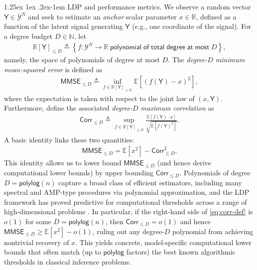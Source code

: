 \documentclass[12pt]{article}
\makeatletter
\newcommand{\pp}[1]{\left[#1\right]}
\newcommand{\s}[1]{\mathsf{#1}}
\renewcommand{\paragraph}{%
  \@startsection{paragraph}{4}%
  {\z@}{1.25ex \@plus 1ex \@minus .2ex}{-1em}%
  {\normalfont\normalsize\bfseries}%
}
\makeatother
\begin{document}
\paragraph{LDP and performance metrics.} We observe a random vector $\s{Y} \in \mathcal{Y}^{N}$ and seek to estimate an \emph{anchor} scalar parameter $x \in \mathbb{R}$, defined as a function of the latent signal generating $\s{Y}$ (e.g., one coordinate of the signal). For a degree budget $D \in \mathbb{N}$, let
\begin{align}
\mathbb{R}[\s{Y}]_{\leq D}\triangleq\left\{ f:\mathcal{Y}^{N}\to\mathbb{R}\; \s{polynomial}\;\s{of}\;\s{total}\;\s{degree}\;\s{at}\;\s{most}\;D \right\},
\end{align}
namely, the space of polynomials of degree at most $D$. The \emph{degree-$D$ minimum mean-squared error} is defined as
\begin{align}\label{eq:ldp-mmse-def}
\s{MMSE}_{\leq D}
\triangleq
\inf_{f \in \mathbb{R}[\s{Y}]_{\le D}}\mathbb{E}\left[(f(\s{Y})-x)^2\right],
\end{align}
where the expectation is taken with respect to the joint law of $(x,\s{Y})$. Furthermore, define the associated \emph{degree-$D$ maximum correlation} as
\begin{align}\label{eq:corr-def}
\s{Corr}_{\le D}\triangleq
\sup_{f\in\mathbb{R}[\s{Y}]_{\le D}}
\frac{\mathbb{E}\pp{f(\s{Y})\cdot x}}{\sqrt{\mathbb{E}\pp{f(\s{Y})^2}}}.
\end{align}
A basic identity links these two quantities:
\begin{align}\label{eq:mmse-def}
\s{MMSE}_{\le D} = \mathbb{E}[x^2]-\s{Corr}_{\le D}^{2}.
\end{align}
This identity allows us to lower bound $\s{MMSE}_{\le D}$ (and hence derive computational lower bounds) by upper bounding $\s{Corr}_{\le D}$. Polynomials of degree $D=\s{polylog}(n)$ capture a broad class of efficient estimators, including many spectral and AMP-type procedures via polynomial approximation, and the LDP framework has proved predictive for computational thresholds across a range of high-dimensional problems \cite{SchrammWein2022}. In particular, if the right-hand side of \eqref{eq:corr-def} is $o(1)$ for some $D=\s{polylog}(n)$, then $\s{Corr}_{\le D}=o(1)$ and hence $\s{MMSE}_{\le D}\geq \mathbb{E}[x^2]-o(1)$, ruling out any degree-$D$ polynomial from achieving nontrivial recovery of $x$. This yields concrete, model-specific computational lower bounds that often match (up to $\s{polylog}$ factors) the best known algorithmic thresholds in classical inference problems.
\end{document}
